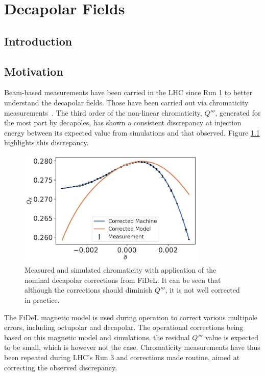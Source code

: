 \chapter{Decapolar Fields}
\thumbforchapter{}
\chaptertoc{}
\newpage

\section{Introduction}

\section{Motivation}

Beam-based measurements have been carried in the LHC since Run 1 to better understand the decapolar
fields. Those have been carried out via chromaticity
measurements~\cite{maclean_non-linear_2011,maclean_commissioning_2016,maclean_measurement_2014}. 
The third order of the non-linear chromaticity, $Q'''$, generated for the most part by decapoles,
has shown a consistent discrepancy at injection energy between its expected value from simulations
and that observed. Figure \ref{fig:decapoles:bare_chroma_vs_simulations} highlights this
discrepancy.

\begin{figure}[H]
    \centering
    \includegraphics[width=0.8\textwidth]{images/dq3_corrected_simulation_fidel.pdf}
    \caption{Measured and simulated chromaticity with application of the nominal decapolar
    corrections from FiDeL. It can be seen that although the corrections should diminish $Q'''$, it
    is not well corrected in practice.}
    \label{fig:decapoles:bare_chroma_vs_simulations}
\end{figure}

The FiDeL magnetic model is used during operation to correct various multipole errors, including
octupolar and decapolar. The operational corrections being based on this magnetic model and
simulations, the residual $Q'''$ value is expected to be small, which is however not the case.
Chromaticity measurements have thus been repeated during LHC's Run 3 and corrections made routine,
aimed at correcting the observed discrepancy.


